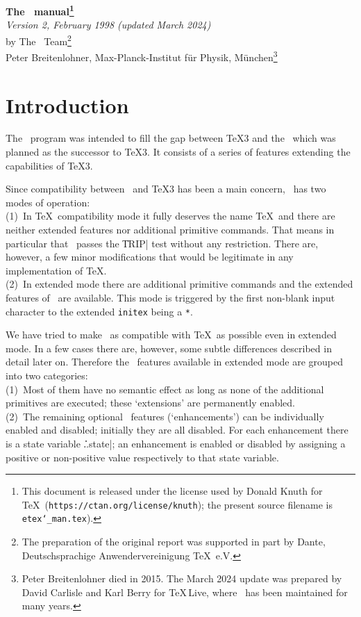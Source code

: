 \documentclass[11pt]{article}
\begin{document}
\begin{center}
{\huge\bf The \eTeX\ manual\footnote{%
  This document is released under the license used by Donald Knuth for
  \TeX\ (\texttt{https://ctan.org/license/knuth}); the present source
  filename is \texttt{etex\char`\_man.tex}).}}
 \\[6pt]
{\sl Version 2, February 1998 (updated March 2024)}
 \\[18pt]
%
by The \NTS\ Team\footnote{%
  The preparation of the original report was supported in part by
  {\sc Dante}, Deutschsprachige Anwendervereinigung \TeX\ e.V.}
 \\[6pt]
Peter Breitenlohner, Max-Planck-Institut f\"ur Physik, M\"unchen\footnote{%
  Peter Breitenlohner died in 2015. The March 2024 update was prepared
  by David Carlisle and Karl Berry for \TeX\,Live, where \eTeX\ has been
  maintained for many years.\raggedright}
\end{center}

\section{Introduction}

The \eTeX\ program was intended to fill the gap between \TeX3 and the
\NTS\ which was planned as the successor to \TeX3.
It consists of a series of features extending the capabilities of
\TeX3.

Since compatibility between \eTeX\ and \TeX3 has been a main concern,
\eTeX\ has two modes of operation:\\
(1)~In \TeX\ compatibility mode it fully deserves the name \TeX\ and
there are neither extended features nor additional primitive commands.
That means in particular that \eTeX\ passes the \|TRIP| test
\cite{tripman} without any restriction.  There are, however, a few
minor modifications that would be legitimate in any implementation of
\TeX.\\
(2)~In extended mode there are additional primitive commands and the
extended features of \eTeX\ are available. This mode is triggered by the
first non-blank input character to the extended \texttt{initex} being a
\texttt{*}.

We have tried to make \eTeX\ as compatible with \TeX\ as possible
even in extended mode.  In a few cases there are, however, some subtle
differences described in detail later on.  Therefore the \eTeX\ features
available in extended mode are grouped into two categories:\\
(1)~Most of them have no semantic effect as long as none of the
additional primitives are executed; these `extensions' are permanently
enabled.\\
(2)~The remaining optional \eTeX\ features (`enhancements') can be
individually enabled and disabled; initially they are all disabled.
For each enhancement there is a state variable \|\...state|; an
enhancement is enabled or disabled by assigning a positive or
non-positive value respectively to that state variable.
\end{document}
